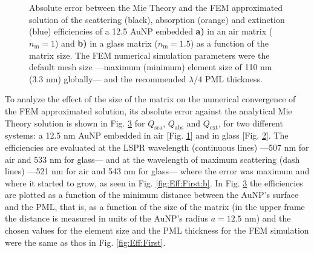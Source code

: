 %
\begin{figure}[b!]
	\centering
	\def\svgwidth{.9\textwidth}
	\small
	\vspace*{1.em}
	\hspace*{-.75\textwidth}
     \begin{subfigure}{\textwidth}\caption{}\label{fig:Eff:Matrix:a}\end{subfigure}\\[6em]
    \hspace*{-.75\textwidth}
     \begin{subfigure}{\textwidth}\caption{}\label{fig:Eff:Matrix:b}\end{subfigure}\\[-10.75em]
\caption[Scattering, Absorption and Extinction Efficiencies absolute error: Matrix size analysis ]{Absolute error between the Mie Theory and the FEM approximated solution of the scattering (black), absorption (orange) and extinction (blue) efficiencies of a 12.5 AuNP embedded \textbf{a)} in an air matrix ($n_\text{m} = 1$) and \textbf{b)} in a glass matrix ($n_\text{m} = 1.5$) as a function of the matrix size. The FEM numerical simulation parameters were the default mesh size ---maximum (minimum) element size of 110 nm (3.3 nm) globally--- and the recommended $\lambda/4$ PML thickness. }
\label{fig:Eff:Matrix}
\end{figure}
%
To analyze the effect of the size of the matrix on the numerical convergence of the FEM approximated solution, its absolute error against the analytical Mie Theory solution is shown in Fig. \ref{fig:Eff:Matrix} for $Q_\text{sca}$, $Q_\text{abs}$ and $Q_\text{ext}$, for two different systems: a 12.5 nm AuNP embedded in air [Fig. \ref{fig:Eff:Matrix:a}] and in glass [Fig. \ref{fig:Eff:Matrix:b}]. The efficiencies are evaluated at the LSPR wavelength (continuous lines) ---507 nm for air and 533 nm for glass--- and at the wavelength of maximum scattering (dash lines) ---521 nm for air and 543 nm for glass--- where the error was maximum and where it started to grow, as seen in Fig. \ref{fig:Eff:First:b}. In Fig. \ref{fig:Eff:Matrix} the efficiencies are plotted as a function of the minimum distance between the AuNP's surface and the PML, that is, as a function of the size of the matrix (in the upper frame the distance is measured in units of the AuNP's radius $a=12.5$ nm) and the chosen values for the element size and the PML thickness for the FEM simulation were the same as thos in Fig. \ref{fig:Eff:First}.

